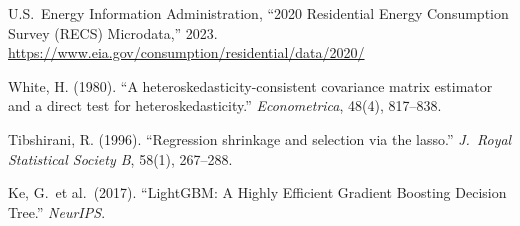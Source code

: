 \documentclass[10pt,twocolumn]{article}
\begin{document}
\begin{enumerate}[label={[\arabic*]},leftmargin=1.5em,nosep]
\item U.S.\ Energy Information Administration, ``2020 Residential Energy Consumption Survey (RECS) Microdata,'' 2023. \url{https://www.eia.gov/consumption/residential/data/2020/}
\item White, H. (1980). ``A heteroskedasticity-consistent covariance matrix estimator and a direct test for heteroskedasticity.'' \textit{Econometrica}, 48(4), 817--838.
\item Tibshirani, R. (1996). ``Regression shrinkage and selection via the lasso.'' \textit{J.\ Royal Statistical Society B}, 58(1), 267--288.
\item Ke, G.\ et al.\ (2017). ``LightGBM: A Highly Efficient Gradient Boosting Decision Tree.'' \textit{NeurIPS}.
\end{enumerate}
\end{document}
